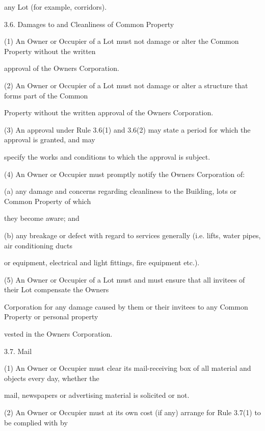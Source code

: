 \documentclass{article}
\begin{document}
{\fontsize{10.02}{1}any Lot (for example, corridors). }

{\fontsize{9.99}{1}3.6. Damages to and Cleanliness of Common Property }

{\fontsize{9.962}{1}(1) An Owner or Occupier of a Lot must not damage or alter the Common Property without the written }

{\fontsize{10.02}{1}approval of the Owners Corporation. }

{\fontsize{9.962}{1}(2) An Owner or Occupier of a Lot must not damage or alter a structure that forms part of the Common }

{\fontsize{10.02}{1}Property without the written approval of the Owners Corporation. }

{\fontsize{9.962}{1}(3) An approval under Rule 3.6(1) and 3.6(2) may state a period for which the approval is granted, and may }

{\fontsize{10.02}{1}specify the works and conditions to which the approval is subject. }

{\fontsize{9.962}{1}(4) An Owner or Occupier must promptly notify the Owners Corporation of: }

{\fontsize{9.962}{1}(a) any damage and concerns regarding cleanliness to the Building, lots or Common Property of which }

{\fontsize{10.02}{1}they become aware; and }

{\fontsize{9.962}{1}(b) any breakage or defect with regard to services generally (i.e. lifts, water pipes, air conditioning ducts }

{\fontsize{10.02}{1}or equipment, electrical and light fittings, fire equipment etc.). }

{\fontsize{9.962}{1}(5) An Owner or Occupier of a Lot must and must ensure that all invitees of their Lot compensate the Owners }

{\fontsize{10.02}{1}Corporation for any damage caused by them or their invitees to any Common Property or personal property }

{\fontsize{10.02}{1}vested in the Owners Corporation. }

{\fontsize{9.99}{1}3.7. Mail }

{\fontsize{9.962}{1}(1) An Owner or Occupier must clear its mail-receiving box of all material and objects every day, whether the }

{\fontsize{10.02}{1}mail, newspapers or advertising material is solicited or not. }

{\fontsize{9.962}{1}(2) An Owner or Occupier must at its own cost (if any) arrange for Rule 3.7(1) to be complied with by }
\end{document}
